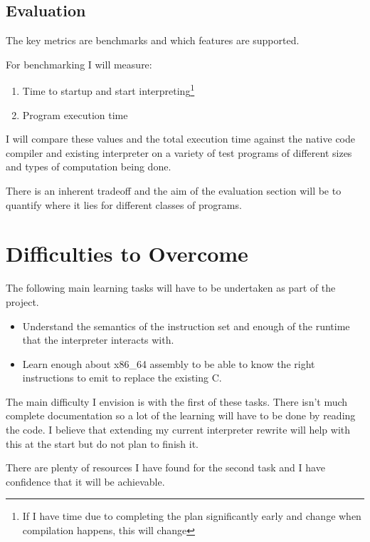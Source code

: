 \documentclass[12pt,a4paper, headings=standardclasses]{scrartcl}
\begin{document}
\subsection*{Evaluation}

The key metrics are benchmarks and which features are supported.

For benchmarking I will measure:

\begin{enumerate}
    \item Time to startup and start interpreting\footnote{If I have time due to completing the plan significantly early and change when compilation happens, this will change}
    \item Program execution time
\end{enumerate}

I will compare these values and the total execution time against the native
code compiler and existing interpreter on a variety of test programs of
different sizes and types of computation being done.

There is an inherent tradeoff and the aim of the evaluation section will be
to quantify where it lies for different classes of programs.

\section*{Difficulties to Overcome}

The following main learning tasks will have to be undertaken as part of the
project.

\begin{itemize}

    \item Understand the semantics of the instruction set and enough of the
        runtime that the interpreter interacts with.
    \item Learn enough about x86\_64 assembly to be able to know the right
        instructions to emit to replace the existing C.
\end{itemize}

The main difficulty I envision is with the first of these tasks. There isn't
much complete documentation so a lot of the learning will have to be done by
reading the code. I believe that extending my current interpreter rewrite will
help with this at the start but do not plan to finish it.

There are plenty of resources I have found for the second task and I have
confidence that it will be achievable.
\end{document}
